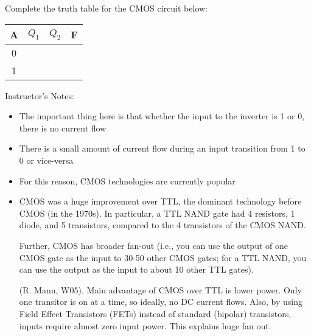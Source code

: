 \begin{frame}[fragile]
\begin{tcolorbox}[enhanced,attach boxed title to top center={yshift=-3mm,yshifttext=-1mm},
  colback=red!5!white,colframe=red!75!black,colbacktitle=red!80!black,
  title=Try this,fonttitle=\bfseries,
  boxed title style={size=small,colframe=red!50!black} ]
  Complete the truth table for the CMOS circuit below:

		\begin{center}
		\begin{tabular}{c|cc|c}
		A & $Q_1$ & $Q_2$ & F\\\hline
		0 & & \\
		1 & & \\
		\end{tabular}
		\end{center}
\end{tcolorbox}

\end{frame}
\BNotes\ifnum{}
\begin{frame}[fragile]
Instructor's Notes:
\begin{itemize}
\item The important thing here is that whether the input to the inverter is 1 or 0, there is no current flow
\item There is a small amount of current flow during an input transition from 1 to 0 or vice-versa
\item For this reason, CMOS technologies are currently popular

\item CMOS was a huge improvement over TTL, the dominant technology before
	CMOS (in the 1970s).  In particular, a TTL NAND
	gate had 4 resistors, 1 diode, and 5 transistors, compared to
	the 4 transistors of the CMOS NAND.  

	Further, CMOS has broader
	fan-out (i.e., you can use the output of one CMOS gate as the
	input to 30-50 other CMOS gates; for a TTL NAND, you can use
	the output as the input to about 10 other TTL gates).

        (R. Mann, W05).  Main advantage of CMOS over TTL is lower power.  Only
        one transitor is on at a time, so ideally, no DC current flows.  Also,
        by using Field Effect Transistors (FETs) instead of standard (bipolar)
        transistors, inputs require almost zero input power.  This explains
        huge fan out.

\end{itemize}
\end{frame}
\fi\ENotes


